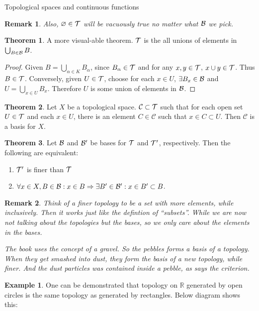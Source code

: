 \documentclass{report}
\let\emptyset\varnothing
\newtheorem*{remark}{Remark}
\theoremstyle{definition}
\newtheorem{theorem}{Theorem}[chapter]
\newtheorem{example}{Example}[theorem]
\newcommand{\RA}{\ensuremath\Rightarrow}
\newcommand{\RR}{\mathbb{R}}
\newcommand{\ex}{\ensuremath\exists}
\begin{document}
\begin{chapter}{Topological spaces and continuous functions}
\begin{remark}
    Also, $\emptyset\in\T$ will be vacuously true no matter what $\mathcal{B}$
    we pick.
  \end{remark}
  \begin{theorem}
    A more visual-able theorem. $\mathcal{T}$ is the all unions of elements in
    $\bigcup_{B\in\mathcal{B}} B$.
  \end{theorem}
  \begin{proof}
    Given $B=\bigcup_{\alpha\in K} B_\alpha$, since $B_\alpha\in\mathcal{T}$
    and for any $x,y\in\mathcal{T}$, $x\cup y\in\mathcal{T}$. Thus $B\in\mathcal{T}$. Conversely,
    given $U\in\mathcal{T}$, choose for each $x\in U$, $\ex B_x\in\B$ and
    $U=\bigcup_{x\in U} B_x$. Therefore $U$ is some union of elements
    in $\mathcal{B}$.
  \end{proof}
  \begin{theorem}
    Let $X$ be a topological space. $\mathcal{C}\subset \mathcal{T}$ such that
    for each open set $U\in\mathcal{T}$ and each $x\in U$, there is an element
    $C\in\mathcal{C}$ such that $x\in C\subset U$. Then $\mathcal{C}$
    is a basis for $X$.
  \end{theorem}
  \begin{theorem}
    Let $\mathcal{B}$ and $\mathcal{B}'$ be bases for $\mathcal{T}$ and $\mathcal{T}'$, respectively. Then
    the following are equivalent:
    \begin{enumerate}
    \item $\mathcal{T}'$ is finer than $\mathcal{T}$
    \item
      $\forall x\in X, B\in\B : x\in B \RA \exists B'\in\B' : x\in B'
      \subset B$.
    \end{enumerate}
  \end{theorem}
  \begin{remark}
    Think of a finer topology to be a set with more elements, while
    inclusively. Then it works just like the defintion of
    ``subsets''. While we are now not talking about the topologies but
    the bases, so we only care about the elements in the bases.

    The book uses the concept of a gravel. So the pebbles forms a
    basis of a topology. When they get smashed into dust, they form
    the basis of a new topology, while finer. And the dust particles
    was contained inside a pebble, as says the criterion.
  \end{remark}
  \begin{example}
    One can be demonstrated that topology on $\RR$ generated by open
    circles is the same topology as generated by rectangles. Below
    diagram shows this:

    \begin{figure}[H]
      \centering
\end{figure}
\end{example}
\end{chapter}
\end{document}
